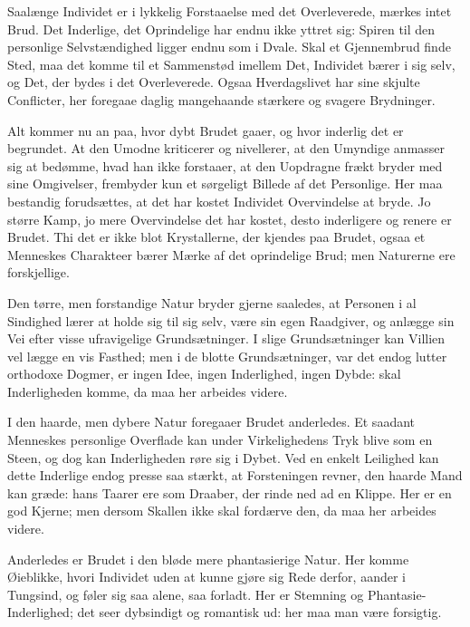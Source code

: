 \documentclass[12pt,a4paper]{book}
\newcommand{\apage}[1]{\marginnote{\footnotesize\textit{[#1]}}}
\begin{document}
Saalænge Individet er i lykkelig Forstaaelse med det Overleverede, mærkes
intet Brud. Det Inderlige, det Oprindelige har endnu ikke yttret sig:
Spiren til den personlige Selvstændighed ligger endnu som i Dvale. Skal
et Gjennembrud finde Sted, maa det komme til et Sammenstød imellem Det,
Individet bærer i sig selv, og Det, der bydes i det Overleverede. Ogsaa
Hverdagslivet har sine skjulte \apage{123}
Conflicter, her foregaae daglig mangehaande stærkere og svagere
Brydninger.

Alt kommer nu an paa, hvor dybt Brudet gaaer, og hvor inderlig det er
begrundet. At den Umodne kriticerer og nivellerer, at den Umyndige
anmasser sig at bedømme, hvad han ikke forstaaer, at den Uopdragne frækt
bryder med sine Omgivelser, frembyder kun et sørgeligt Billede af det
Personlige. Her maa bestandig forudsættes, at det har kostet Individet
Overvindelse at bryde. Jo større Kamp, jo mere Overvindelse det har
kostet, desto inderligere og renere er Brudet. Thi det er ikke blot
Krystallerne, der kjendes paa Brudet, ogsaa et Menneskes Charakteer bærer
Mærke af det oprindelige Brud; men Naturerne ere forskjellige.

Den tørre, men forstandige Natur bryder gjerne saaledes, at Personen i al
Sindighed lærer at holde sig til sig selv, være sin egen Raadgiver, og
anlægge sin Vei efter visse ufravigelige Grundsætninger. I slige
Grundsætninger kan Villien vel lægge en vis Fasthed; men i de blotte
Grundsætninger, var det endog lutter orthodoxe Dogmer, er ingen Idee,
ingen Inderlighed, ingen Dybde: skal Inderligheden komme, da maa her
arbeides videre.

I den haarde, men dybere Natur foregaaer Brudet anderledes. Et saadant
Menneskes personlige Overflade kan under Virkelighedens Tryk blive som en
Steen, og dog kan Inderligheden røre sig i Dybet. Ved en enkelt Leilighed
kan dette Inderlige endog presse saa stærkt, at Forsteningen revner, den
haarde Mand kan græde: hans Taarer ere som Draaber, der rinde ned ad en
Klippe. Her er en god Kjerne; men dersom Skallen ikke skal fordærve den,
da maa her arbeides videre.

Anderledes er Brudet i den bløde mere phantasierige Natur. Her komme
Øieblikke, hvori Individet uden at kunne gjøre sig Rede derfor, aander i
Tungsind, og føler sig saa alene, saa forladt. Her er Stemning og
Phantasie-Inderlighed; det seer dybsindigt og romantisk ud: her maa man
være forsigtig.
 \apage{124}
\end{document}
